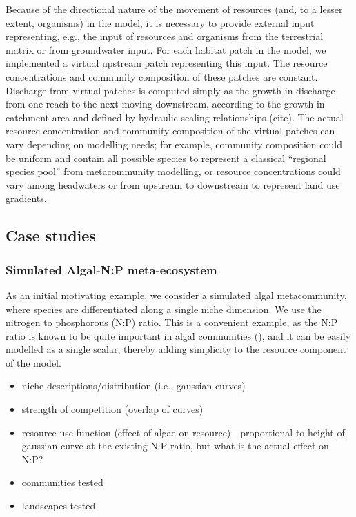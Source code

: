 Because of the directional nature of the movement of resources (and, to a lesser extent, organisms) in the model, it is necessary to provide external input representing, e.g., the input of resources and organisms from the terrestrial matrix or from groundwater input.
For each habitat patch in the model, we implemented a virtual upstream patch representing this input.
The resource concentrations and community composition of these patches are constant.
Discharge from virtual patches is computed simply as the growth in discharge from one reach to the next moving downstream, according to the growth in catchment area and defined by hydraulic scaling relationships (cite).
The actual resource concentration and community composition of the virtual patches can vary depending on modelling needs; for example, community composition could be uniform and contain all possible species to represent a classical “regional species pool” from metacommunity modelling, or resource concentrations could vary among headwaters or from upstream to downstream to represent land use gradients.


\subsection{Case studies}

\subsubsection{Simulated Algal-N:P meta-ecosystem}
As an initial motivating example, we consider a simulated algal metacommunity, where species are differentiated along a single niche dimension.
We use the nitrogen to phosphorous (N:P) ratio.
This is a convenient example, as the N:P ratio is known to be quite important in algal communities (), and it can be easily modelled as a single scalar, thereby adding simplicity to the resource component of the model.	

\begin{itemize}
	\item niche descriptions/distribution (i.e., gaussian curves)
	\item strength of competition (overlap of curves)
	\item resource use function (effect of algae on resource)---proportional to height of gaussian curve at the existing N:P ratio, but what is the actual effect on N:P?
	\item communities tested
	\item landscapes tested 
\end{itemize}

